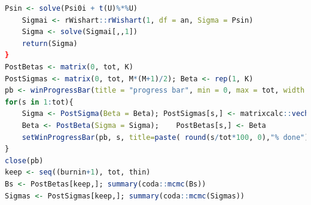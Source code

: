 \begin{enumerate}[leftmargin=*]
\begin{tcolorbox}[enhanced,width=4.67in,center upper,
	fontupper=\large\bfseries,drop shadow southwest,sharp corners]
\begin{VF}
\begin{lstlisting}[language=R]
	Psin <- solve(Psi0i + t(U)%*%U)
	Sigmai <- rWishart::rWishart(1, df = an, Sigma = Psin)
	Sigma <- solve(Sigmai[,,1]) 
	return(Sigma)
}
PostBetas <- matrix(0, tot, K)
PostSigmas <- matrix(0, tot, M*(M+1)/2); Beta <- rep(1, K)
pb <- winProgressBar(title = "progress bar", min = 0, max = tot, width = 300)
for(s in 1:tot){
	Sigma <- PostSigma(Beta = Beta); PostSigmas[s,] <- matrixcalc::vech(Sigma)
	Beta <- PostBeta(Sigma = Sigma); 	PostBetas[s,] <- Beta
	setWinProgressBar(pb, s, title=paste( round(s/tot*100, 0),"% done"))
}
close(pb)
keep <- seq((burnin+1), tot, thin)
Bs <- PostBetas[keep,]; summary(coda::mcmc(Bs))
Sigmas <- PostSigmas[keep,]; summary(coda::mcmc(Sigmas))
\end{lstlisting}
	\end{VF}
\end{tcolorbox} 


\end{enumerate}
